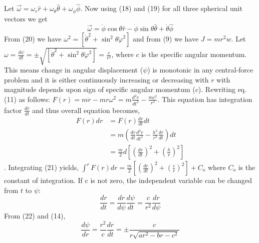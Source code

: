 \documentclass[conference]{IEEEtran}
\begin{document}
 Let $\vec{\omega} = \omega_{r}\hat{r} + \omega_{\theta}\hat{\theta} + \omega_{\phi}\hat{\phi}$. Now using (18) and (19) for all three spherical unit vectors we get \begin{equation}
\vec{\omega} = \dot{\phi} \cos \theta \hat{r}-\dot{\phi} \sin \theta \hat{\theta} +\dot{\theta} \hat{\phi}
\end{equation}
From (20) we have $\omega^{2} = \left[\dot{\theta}^{2}+\sin ^{2} \theta \dot{\varphi}^{2}\right]$ and from (9) we have $J = mr^{2}w$. Let $\omega = \frac{d\psi}{dt} =\pm \sqrt{\left[\dot{\theta}^{2}+\sin ^{2} \theta \dot{\varphi}^{2}\right]} = \frac{c}{r^{2}}$, where $c$ is the specific angular momentum. This means change in angular displacement ($\psi$) is monotonic in any central-force problem and it is either continuously increasing or decreasing with $r$ with magnitude depends upon sign of specific angular momentum ($c$). Rewriting eq. (11) as follows: $F(r)=m \ddot{r}-m r \omega^{2}=m \frac{d^{2} r}{d t^{2}}-\frac{m c^{2}}{r^{3}}$. This equation has integration factor $\frac{dr}{dt}$ and thus overall equation becomes, \begin{equation}
\begin{aligned}
F(r) d r &=F(r) \frac{d r}{d t} d t \\
&=m\left(\frac{d r}{d t} \frac{d^{2} r}{d t^{2}}-\frac{h^{2}}{r^{3}} \frac{d r}{d t}\right) d t \\
&=\frac{m}{2} d\left[\left(\frac{d r}{d t}\right)^{2}+\left(\frac{h}{r}\right)^{2}\right]
\end{aligned}
\end{equation}. Integrating (21) yields, $\int^{r} F(r) d r=\frac{m}{2}\left[\left(\frac{d r}{d t}\right)^{2}+\left(\frac{c}{r}\right)^{2}\right] + C_{o}$ where $C_{o}$ is the constant of integration. If c is not zero, the independent variable can be changed from $t$ to $\psi$: \begin{equation}
\frac{dr}{d t}=\frac{dr}{d \psi}\frac{d\psi}{d t} = \frac{c}{r^{2}}\frac{dr}{d \psi}
\end{equation} 
From (22) and (14), \begin{equation}
    \frac{d\psi}{d r} = \frac{r^{2}}{c}\frac{dr}{d t} = \pm\frac{c}{r\sqrt{ar^{2} - br - c^{2}}}
\end{equation}
\end{document}
